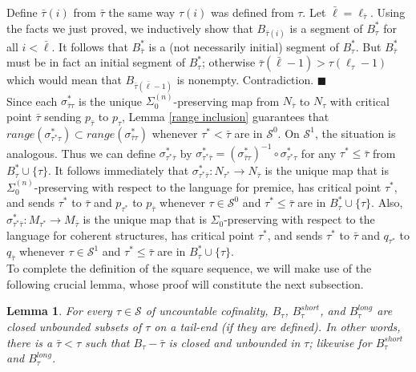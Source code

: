 \documentclass[12pt]{article}
\newtheorem{lem}[thm]{Lemma}
\begin{document}
 Define $\bar{\tau} (i)$ from $\bar{\tau}$ the same way $\tau (i)$ was defined from $\tau$.  Let $\bar{\ell} = \ell_{\bar{\tau}}$.  Using the facts we just proved, we inductively show that $B_{\bar{\tau} (i)}$ is a segment of $B_{\tau}^*$ for all $i < \bar{\ell}$.  It follows that $B_{\bar{\tau}}^*$ is a (not necessarily initial) segment of $B_\tau^*$.  But $B_{\bar{\tau}}^*$ must be in fact an initial segment of $B_\tau^*$; otherwise $\bar{\tau} ( \bar{\ell} - 1 ) > \tau ( \ell_\tau - 1 )$ which would mean that $B_{\bar{\tau} ( \bar{\ell} - 1 )}$ is nonempty.  Contradiction.  $\blacksquare$\\
 
 
Since each $\sigma_{\bar{\tau} \tau }^*$ is the unique $\Sigma_0^{(n)}$-preserving map from $N_{\bar{\tau}}$ to $N_{\tau}$ with critical point $\bar{\tau}$ sending $p_{\bar{\tau}}$ to $p_\tau$, Lemma \ref{range inclusion} guarantees that $range ( \sigma_{\tau^* \tau }^*) \subset range ( \sigma_{\bar{\tau} \tau }^*)$ whenever $\tau^* < \bar{\tau}$ are in $\mathcal{S}^0$.  On $\mathcal{S}^1$, the situation is analogous.  Thus we can define $\sigma_{\tau^* \bar{\tau} }^*$ by $\sigma_{\tau^* \bar{\tau} }^* = ( \sigma_{\bar{\tau} \tau }^*)^{-1} \circ \sigma_{\tau^* \tau }^*$ for any $\tau^* \leq \bar{\tau}$ from $B_\tau^* \cup \{ \tau \}$.  It follows immediately that $\sigma_{\tau^* \bar{\tau} }^* : N_{\tau^*} \longrightarrow N_{\bar{\tau}}$ is the unique map that is $\Sigma_0^{(n)}$-preserving with respect to the language for premice, has critical point $\tau^*$, and sends $\tau^*$ to $\bar{\tau}$ and $p_{\tau^*}$ to $p_{\bar{\tau}}$ whenever $\tau \in \mathcal{S}^0$ and $\tau^* \leq \bar{\tau}$ are in $B_\tau^* \cup \{ \tau \}$.  Also, $\sigma_{\tau^* \bar{\tau} }^* : M_{\tau^*} \longrightarrow M_{\bar{\tau}}$ is the unique map that is $\Sigma_0$-preserving with respect to the language for coherent structures, has critical point $\tau^*$, and sends $\tau^*$ to $\bar{\tau}$ and $q_{\tau^*}$ to $q_{\bar{\tau}}$ whenever $\tau \in \mathcal{S}^1$ and $\tau^* \leq \bar{\tau}$ are in $B_\tau^* \cup \{ \tau \}$.\\

To complete the definition of the square sequence, we will make use of the following crucial lemma, whose proof will constitute the next subsection.

\begin{lem} \label{B-tau is a club on a tail-end}
For every $\tau \in \mathcal{S}$ of uncountable cofinality, $B_\tau$, $B_\tau^{short}$, and $B_\tau^{long}$ are closed unbounded subsets of $\tau$ on a tail-end (if they are defined).  In other words, there is a $\bar{\tau} < \tau$ such that $B_\tau - \bar{\tau}$ is closed and unbounded in $\tau$; likewise for $B_\tau^{short}$ and $B_\tau^{long}$.
\end{lem}
 
\end{document}
